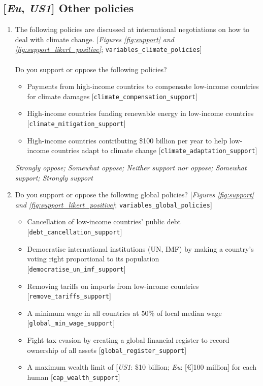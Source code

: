 \subsection*{[\textit{Eu}, \textit{US1}] Other policies}
\begin{enumerate}[resume] \item  \label{q:climate_policies} The following policies are discussed  at international negotiations on how to deal with climate change. [\textit{Figures \ref{fig:support} and \ref{fig:support_likert_positive}}; \verb|variables_climate_policies|]\\
\\
Do you support or oppose the following policies?
\begin{itemize}
    \item  Payments from high-income countries to compensate low-income countries for climate damages [\verb|climate_compensation_support|]
    \item  High-income countries funding renewable energy in low-income countries [\verb|climate_mitigation_support|]
    \item  High-income countries contributing \$100 billion per year to help low-income countries adapt to climate change [\verb|climate_adaptation_support|]
\end{itemize}
\textit{Strongly oppose; Somewhat oppose; Neither support nor oppose; Somewhat support; Strongly support}
\item  \label{q:other_policies} Do you support or oppose the following global policies? [\textit{Figures \ref{fig:support} and \ref{fig:support_likert_positive}}; \verb|variables_global_policies|]
\begin{itemize}
    \item  Cancellation of low-income countries' public debt [\verb|debt_cancellation_support|]
    \item  Democratise international institutions (UN, IMF) by making a country's voting right proportional to its population [\verb|democratise_un_imf_support|]
    \item  Removing tariffs on imports from low-income countries [\verb|remove_tariffs_support|]
    \item  A minimum wage in all countries at 50\% of local median wage [\verb|global_min_wage_support|]
    \item  Fight tax evasion by creating a global financial register to record ownership of all assets [\verb|global_register_support|]
    \item  A maximum wealth limit of [\textit{US1}: \$10 billion; \textit{Eu}: [\euro{}]100 million] for each human [\verb|cap_wealth_support|]

\end{itemize}
\end{enumerate}
